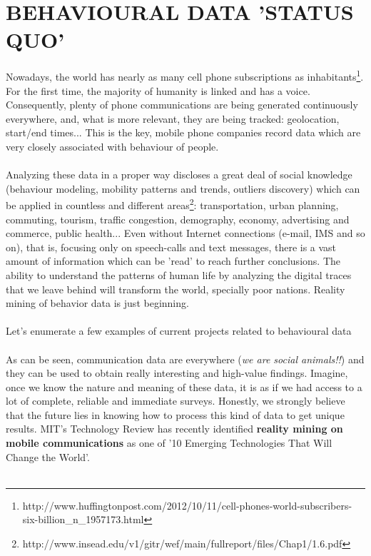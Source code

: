 \newpage

\section{BEHAVIOURAL DATA 'STATUS QUO'}
Nowadays, the world has nearly as many cell phone subscriptions as inhabitants\footnote{http://www.huffingtonpost.com/2012/10/11/cell-phones-world-subscribers-six-billion_n_1957173.html}. For the first time, the majority of humanity is linked and has a voice. Consequently, plenty of phone communications are being generated continuously everywhere, and, what is more relevant, they are being tracked: geolocation, start/end times... This is the key, mobile phone companies record data which are very closely associated with behaviour of people.
\\
\\
Analyzing these data in a proper way discloses a great deal of social knowledge (behaviour modeling, mobility patterns and trends, outliers discovery) which can be applied in countless and different areas\footnote{http://www.insead.edu/v1/gitr/wef/main/fullreport/files/Chap1/1.6.pdf}: transportation, urban planning, commuting, tourism, traffic congestion, demography, economy, advertising and commerce, public health... Even without Internet connections (e-mail, IMS and so on), that is, focusing only on speech-calls and text messages, there is a vast amount of information which can be 'read' to reach further conclusions. The ability to understand the patterns of human life by analyzing the digital traces that we leave behind will transform the world, specially poor nations. Reality mining of behavior data is just beginning.
\\
\\
Let’s enumerate a few examples of current projects related to behavioural data
\\
\\
As can be seen, communication data are everywhere ({\it we are social animals!!}) and they can be used to obtain really interesting and high-value findings. Imagine, once we know the nature and meaning of these data, it is as if we had access to a lot of complete, reliable and immediate surveys. Honestly, we strongly believe that the future lies in knowing how to process this kind of data to get unique results. MIT's Technology Review has recently identified {\bf reality mining on mobile communications} as one of '10 Emerging Technologies That Will Change the World'.
\\
\\
